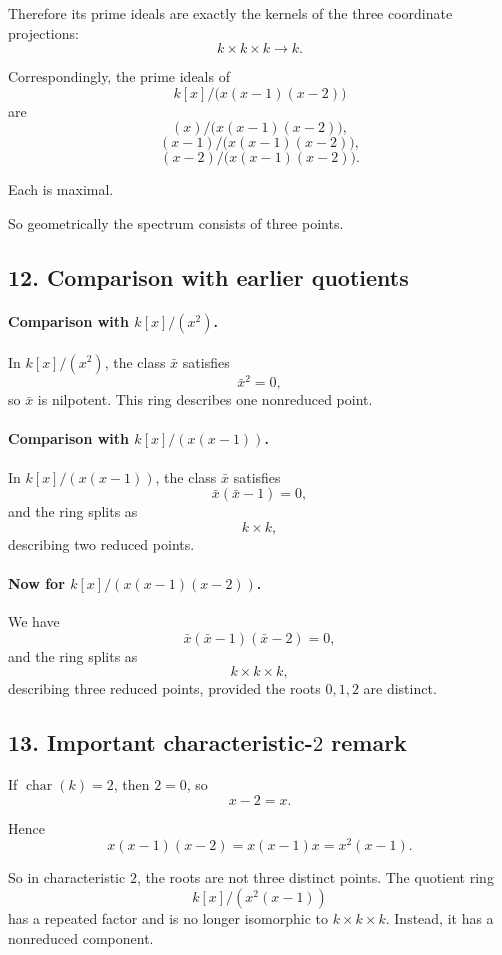 \documentclass[12pt,a4paper]{article}
\theoremstyle{notespace}
\begin{document}
Therefore its prime ideals are exactly the kernels of the three coordinate projections:
\[
k\times k\times k\to k.
\]

Correspondingly, the prime ideals of
\[
k[x]/\bigl(x(x-1)(x-2)\bigr)
\]
are
\[
(x)\big/\bigl(x(x-1)(x-2)\bigr),
\]
\[
(x-1)\big/\bigl(x(x-1)(x-2)\bigr),
\]
\[
(x-2)\big/\bigl(x(x-1)(x-2)\bigr).
\]

Each is maximal.

So geometrically the spectrum consists of three points.

\subsection*{12. Comparison with earlier quotients}

\paragraph{Comparison with \(k[x]/(x^2)\).}
In \(k[x]/(x^2)\), the class \(\bar x\) satisfies
\[
\bar x^2=0,
\]
so \(\bar x\) is nilpotent. This ring describes one nonreduced point.

\paragraph{Comparison with \(k[x]/(x(x-1))\).}
In \(k[x]/(x(x-1))\), the class \(\bar x\) satisfies
\[
\bar x(\bar x-1)=0,
\]
and the ring splits as
\[
k\times k,
\]
describing two reduced points.

\paragraph{Now for \(k[x]/(x(x-1)(x-2))\).}
We have
\[
\bar x(\bar x-1)(\bar x-2)=0,
\]
and the ring splits as
\[
k\times k\times k,
\]
describing three reduced points, provided the roots \(0,1,2\) are distinct.

\subsection*{13. Important characteristic-\(2\) remark}

If \(\operatorname{char}(k)=2\), then \(2=0\), so
\[
x-2=x.
\]

Hence
\[
x(x-1)(x-2)=x(x-1)x=x^2(x-1).
\]

So in characteristic \(2\), the roots are not three distinct points. The quotient ring
\[
k[x]/(x^2(x-1))
\]
has a repeated factor and is no longer isomorphic to \(k\times k\times k\). Instead, it has a nonreduced component.
\end{document}
